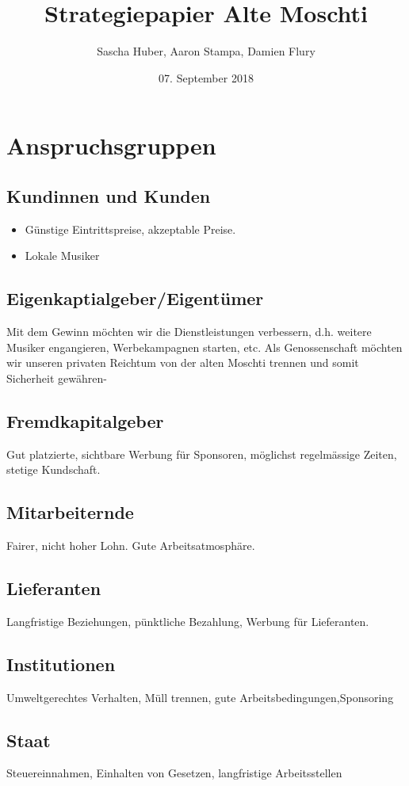 \documentclass[a4paper, titlepage]{article}
\title{Strategiepapier Alte Moschti}
\author{Sascha Huber, Aaron Stampa, Damien Flury}
\date{07. September 2018}
\begin{document}
\maketitle

\tableofcontents
\newpage

\section{Anspruchsgruppen}
\subsection{Kundinnen und Kunden}
\begin{itemize}
  \item Günstige Eintrittspreise, akzeptable Preise.
  \item Lokale Musiker
\end{itemize}
\subsection{Eigenkaptialgeber/Eigentümer}
Mit dem Gewinn möchten wir die Dienstleistungen verbessern, d.h. weitere Musiker engangieren,
Werbekampagnen starten, etc. Als Genossenschaft möchten wir unseren privaten Reichtum von der
alten Moschti trennen und somit Sicherheit gewähren-
\subsection{Fremdkapitalgeber}
Gut platzierte, sichtbare Werbung für Sponsoren, möglichst regelmässige Zeiten, stetige Kundschaft.
\subsection{Mitarbeiternde}
Fairer, nicht hoher Lohn. Gute Arbeitsatmosphäre.
\subsection{Lieferanten}
Langfristige Beziehungen, pünktliche Bezahlung, Werbung für Lieferanten.
\subsection{Institutionen}
Umweltgerechtes Verhalten, Müll trennen, gute Arbeitsbedingungen,Sponsoring
\subsection{Staat}
Steuereinnahmen, Einhalten von Gesetzen, langfristige Arbeitsstellen
\end{document}
